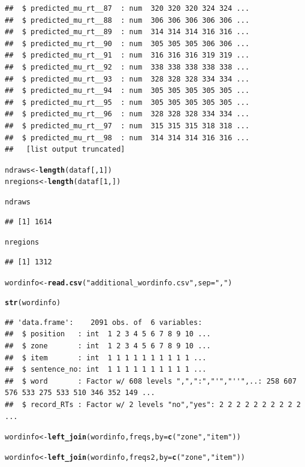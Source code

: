 \documentclass{article}\usepackage[]{graphicx}\usepackage[]{color}
\makeatletter
\newcommand{\hlnum}[1]{\textcolor[rgb]{0.686,0.059,0.569}{#1}}%
\newcommand{\hlstr}[1]{\textcolor[rgb]{0.192,0.494,0.8}{#1}}%
\newcommand{\hlstd}[1]{\textcolor[rgb]{0.345,0.345,0.345}{#1}}%
\newcommand{\hlkwb}[1]{\textcolor[rgb]{0.69,0.353,0.396}{#1}}%
\newcommand{\hlkwc}[1]{\textcolor[rgb]{0.333,0.667,0.333}{#1}}%
\newcommand{\hlkwd}[1]{\textcolor[rgb]{0.737,0.353,0.396}{\textbf{#1}}}%
\newenvironment{kframe}{%
 \def\at@end@of@kframe{}%
 \ifinner\ifhmode%
  \def\at@end@of@kframe{\end{minipage}}%
  \begin{minipage}{\columnwidth}%
 \fi\fi%
 \def\FrameCommand##1{\hskip\@totalleftmargin \hskip-\fboxsep
 \colorbox{shadecolor}{##1}\hskip-\fboxsep
     \hskip-\linewidth \hskip-\@totalleftmargin \hskip\columnwidth}%
 \MakeFramed {\advance\hsize-\width
   \@totalleftmargin\z@ \linewidth\hsize
   \@setminipage}}%
 {\par\unskip\endMakeFramed%
 \at@end@of@kframe}
\newenvironment{knitrout}{}{} %
\makeatother
\begin{document}
\begin{knitrout}
\begin{kframe}
\begin{verbatim}
##  $ predicted_mu_rt__87  : num  320 320 320 324 324 ...
##  $ predicted_mu_rt__88  : num  306 306 306 306 306 ...
##  $ predicted_mu_rt__89  : num  314 314 314 316 316 ...
##  $ predicted_mu_rt__90  : num  305 305 305 306 306 ...
##  $ predicted_mu_rt__91  : num  316 316 316 319 319 ...
##  $ predicted_mu_rt__92  : num  338 338 338 338 338 ...
##  $ predicted_mu_rt__93  : num  328 328 328 334 334 ...
##  $ predicted_mu_rt__94  : num  305 305 305 305 305 ...
##  $ predicted_mu_rt__95  : num  305 305 305 305 305 ...
##  $ predicted_mu_rt__96  : num  328 328 328 334 334 ...
##  $ predicted_mu_rt__97  : num  315 315 315 318 318 ...
##  $ predicted_mu_rt__98  : num  314 314 314 316 316 ...
##   [list output truncated]
\end{verbatim}
\begin{alltt}
\hlstd{ndraws} \hlkwb{<-} \hlkwd{length}\hlstd{(dataf[,} \hlnum{1}\hlstd{])}
\hlstd{nregions} \hlkwb{<-} \hlkwd{length}\hlstd{(dataf[}\hlnum{1}\hlstd{, ])}

\hlstd{ndraws}
\end{alltt}
\begin{verbatim}
## [1] 1614
\end{verbatim}
\begin{alltt}
\hlstd{nregions}
\end{alltt}
\begin{verbatim}
## [1] 1312
\end{verbatim}
\begin{alltt}
\hlstd{wordinfo} \hlkwb{<-} \hlkwd{read.csv}\hlstd{(}\hlstr{"additional_wordinfo.csv"}\hlstd{,} \hlkwc{sep} \hlstd{=} \hlstr{","}\hlstd{)}

\hlkwd{str}\hlstd{(wordinfo)}
\end{alltt}
\begin{verbatim}
## 'data.frame':	2091 obs. of  6 variables:
##  $ position   : int  1 2 3 4 5 6 7 8 9 10 ...
##  $ zone       : int  1 2 3 4 5 6 7 8 9 10 ...
##  $ item       : int  1 1 1 1 1 1 1 1 1 1 ...
##  $ sentence_no: int  1 1 1 1 1 1 1 1 1 1 ...
##  $ word       : Factor w/ 608 levels ",",":","'","''",..: 258 607 576 533 275 533 510 346 352 149 ...
##  $ record_RTs : Factor w/ 2 levels "no","yes": 2 2 2 2 2 2 2 2 2 2 ...
\end{verbatim}
\begin{alltt}
\hlstd{wordinfo} \hlkwb{<-} \hlkwd{left_join}\hlstd{(wordinfo, freqs,} \hlkwc{by} \hlstd{=} \hlkwd{c}\hlstd{(}\hlstr{"zone"}\hlstd{,} \hlstr{"item"}\hlstd{))}

\hlstd{wordinfo} \hlkwb{<-} \hlkwd{left_join}\hlstd{(wordinfo, freqs2,} \hlkwc{by} \hlstd{=} \hlkwd{c}\hlstd{(}\hlstr{"zone"}\hlstd{,} \hlstr{"item"}\hlstd{))}


\end{alltt}
\end{kframe}
\end{knitrout}
\end{document}
